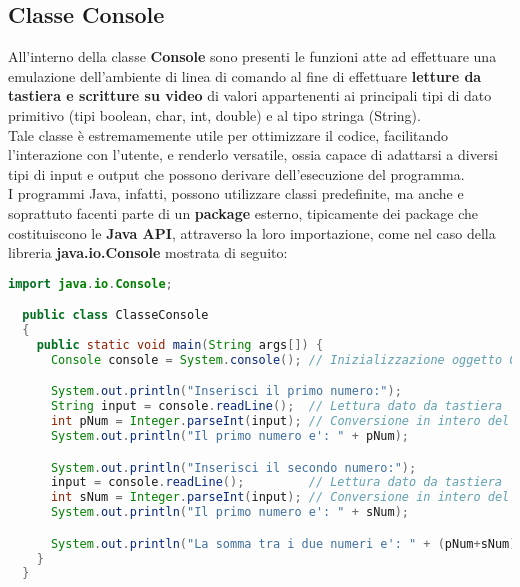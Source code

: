 \documentclass[a4paper]{extarticle}
\begin{document}
\subsection{Classe Console}
All'interno della classe \textbf{Console} sono presenti le funzioni atte ad effettuare una emulazione dell'ambiente di linea di comando al fine di effettuare \textbf{letture da tastiera e scritture su video} di valori appartenenti ai principali tipi di dato primitivo (tipi boolean, char, int, double) e al tipo stringa (String).\\
Tale classe è estremamemente utile per ottimizzare il codice, facilitando l'interazione con l'utente, e renderlo versatile, ossia capace di adattarsi a diversi tipi di input e output che possono derivare dell'esecuzione del programma.\\
I programmi Java, infatti, possono utilizzare classi predefinite, ma anche e soprattuto facenti parte di un \textbf{package} esterno, tipicamente dei package che costituiscono le \textbf{Java API}, attraverso la loro importazione, come nel caso della libreria \textbf{java.io.Console} mostrata di seguito:

\vspace{1em}
\noindent
\begin{lstlisting}[language=Java, caption=Classe Console in Java]
  import java.io.Console;

  public class ClasseConsole
  {
    public static void main(String args[]) {
      Console console = System.console(); // Inizializzazione oggetto Console

      System.out.println("Inserisci il primo numero:");
      String input = console.readLine();  // Lettura dato da tastiera
      int pNum = Integer.parseInt(input); // Conversione in intero del dato letto
      System.out.println("Il primo numero e': " + pNum);

      System.out.println("Inserisci il secondo numero:");
      input = console.readLine();         // Lettura dato da tastiera
      int sNum = Integer.parseInt(input); // Conversione in intero del dato letto
      System.out.println("Il primo numero e': " + sNum);

      System.out.println("La somma tra i due numeri e': " + (pNum+sNum));
    }
  }
\end{lstlisting}
\vspace{1em}
\end{document}
